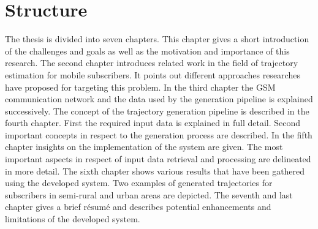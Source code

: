 \documentclass[master,english]{hgbthesis}
\begin{document}
\section{Structure}
The thesis is divided into seven chapters. This chapter gives a short introduction of the challenges and goals as well as the motivation and importance of this research. 
The second chapter introduces related work in the field of trajectory estimation for mobile subscribers. It points out different approaches researches have proposed for targeting this problem.
In the third chapter the GSM communication network and the data used by the generation pipeline is explained successively.
The concept of the trajectory generation pipeline is described in the fourth chapter. First the required input data is explained in full detail. Second important concepts in respect to the generation process are described.
In the fifth chapter insights on the implementation of the system are given. The most important aspects in respect of input data retrieval and processing are delineated in more detail.
The sixth chapter shows various results that have been gathered using the developed system. Two examples of generated trajectories for subscribers in semi-rural and urban areas are depicted.
The seventh and last chapter gives a brief résumé and describes potential enhancements and limitations of the developed system.
%
%
\end{document}
